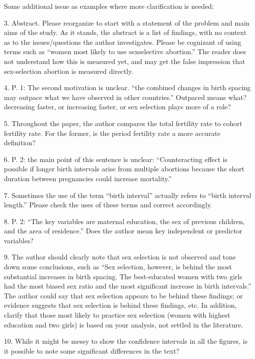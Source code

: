 \documentclass[letterpaper,12pt]{article}
\begin{document}
Some additional issue as examples where more clarification is needed:

3. Abstract. Please reorganize to start with a statement of the problem and main aims of
the study. As it stands, the abstract is a list of findings, with no context as to the
issues/questions the author investigates. Please be cognizant of using terms such as “women
most likely to use sexselective abortion.” The reader does not understand how this is
measured yet, and may get the false impression that sex-selection abortion is measured
directly.

4. P. 1: The second motivation is unclear. “the combined changes in birth spacing may
outpace what we have observed in other countries.” Outpaced means what? decreasing faster,
or increasing faster, or sex selection plays more of a role?

5. Throughout the paper, the author compares the total fertility rate to cohort fertility
rate. For the former, is the period fertility rate a more accurate definition?

6. P. 2: the main point of this sentence is unclear: “Counteracting effect is possible if
longer birth intervals arise from multiple abortions because the short duration between
pregnancies could increase mortality.”

7. Sometimes the use of the term “birth interval” actually refers to “birth interval
length.” Please check the uses of these terms and correct accordingly.

8. P. 2: “The key variables are maternal education, the sex of previous children, and the
area of residence.” Does the author mean key independent or predictor variables?

9. The author should clearly note that sex selection is not observed and tone down some
conclusions, such as “Sex selection, however, is behind the most substantial increases in
birth spacing. The best-educated women with two girls had the most biased sex ratio and the
most significant increase in birth intervals.” The author could say that sex selection
appears to be behind these findings; or evidence suggests that sex selection is behind
these findings, etc. In addition, clarify that those most likely to practice sex selection
(women with highest education and two girls) is based on your analysis, not settled in the
literature.

10. While it might be messy to show the confidence intervals in all the figures, is it
possible to note some significant differences in the text?


\newpage


\end{document}
